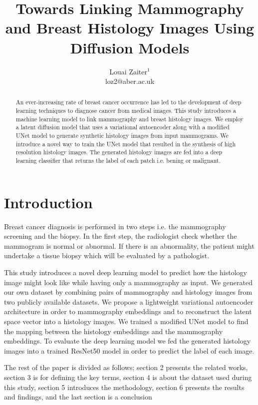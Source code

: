 \documentclass[11pt]{article}
\begin{document}
\title{Towards Linking Mammography and Breast Histology Images Using Diffusion Models}
\author{Louai Zaiter$^{1}$\\ loz2@aber.ac.uk }


\date{}
\maketitle
\begin{abstract}
An ever-increasing rate of breast cancer occurrence has led to the development of deep learning techniques to diagnose cancer from medical images. This study introduces a machine learning model to link mammography and breast histology images. We employ a latent diffusion model that uses a variational autoencoder along with a modified UNet model to generate synthetic histology images from input mammograms. We introduce a novel way to train the UNet model that resulted in the synthesis of high resolution histology images. The generated histology images are fed into a deep learning classifier that returns the label of each patch i.e. bening or malignant.
\end{abstract}

\section{Introduction}
 Breast cancer diagnosis is performed in two steps i.e. the mammography screening and the biopsy. In the first step, the radiologist check whether the mammogram is normal or abnormal. If there is an abnormality, the patient might undertake a tissue biopsy which will be evaluated by a pathologist. 

 This study introduces a novel deep learning model to predict how the histology image might look like while having only a mammography as input. We generated our own dataset by combining pairs of mammography and histology images from two publicly available datasets. We propose a lightweight variational autoencoder architecture in order to mammography embeddings and to reconstruct the latent space vector into a histology images. We trained a modified UNet model to find the mapping between the histology embeddings and the mammography embeddings. To evaluate the deep learning model we fed the generated histology images into a trained ResNet50 model in order to predict the label of each image.

 The rest of the paper is divided as follows; section 2 presents the related works, section 3 is for defining the key terms, section 4 is about the dataset used during this study, section 5 introduces the methodology, section 6 presents the results and findings, and the last section is a conclusion 
\end{document}
